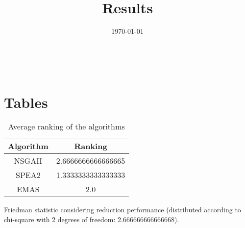 \documentclass{article}
\title{Results}
\author{}
\date{\today}
\begin{document}
\oddsidemargin 0in \topmargin 0in\maketitle
\
\section{Tables}
\begin{table}[!htp]
\centering
\caption{Average ranking of the algorithms}
\begin{tabular}{c|c}
Algorithm&Ranking\\
\hline
NSGAII&2.6666666666666665\\
SPEA2&1.3333333333333333\\
EMAS&2.0\\
\end{tabular}
\end{table}


Friedman statistic considering reduction performance (distributed according to chi-square with 2 degrees of freedom: 2.666666666666668).
\end{document}
